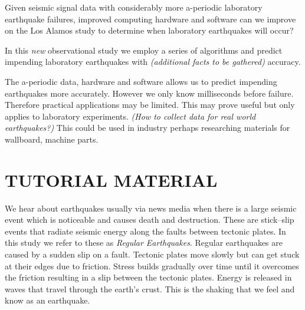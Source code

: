 \documentclass[]{llncs}
\begin{document}
Given seismic signal data with considerably more a-periodic laboratory earthquake failures, improved computing hardware and software can we improve on the Los Alamos study\cite{Bertrand} to determine when laboratory earthquakes will occur?\par

In this {\em new} observational study we employ a series of algorithms and predict impending laboratory earthquakes with {\em (additional facts to be gathered)} accuracy.

The a-periodic data, hardware and software allows us to predict impending earthquakes more accurately. However we only know milliseconds before failure. Therefore practical applications may be limited. This may prove useful but only applies to laboratory experiments. {\em (How to collect data for real world earthquakes?)}  This could be used in industry perhaps researching materials for wallboard, machine parts.\par

\section{TUTORIAL MATERIAL}
We hear about earthquakes usually via news media when there is a large seismic event which is noticeable and causes death and destruction. These are stick–slip events that radiate seismic energy along the faults between tectonic plates. In this study we refer to these as {\em Regular Earthquakes}. Regular earthquakes are caused by a sudden slip on a fault. Tectonic plates move slowly but can get stuck at their edges due to friction. Stress builds gradually over time until it overcomes the friction resulting in a slip between the tectonic plates. Energy is released in waves that travel through the earth's crust. This is the shaking that we feel and know as an earthquake\cite{USGSfaqs}.\par
\end{document}
